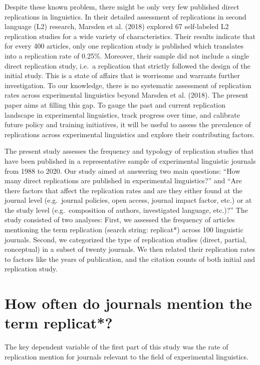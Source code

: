 \documentclass[]{elsarticle} %
\begin{document}
Despite these known problem, there might be only very few published direct replications in linguistics. In their detailed assessment of replications in second language (L2) research, Marsden et al. (2018) explored 67 self-labeled L2 replication studies for a wide variety of characteristics. Their results indicate that for every 400 articles, only one replication study is published which translates into a replication rate of 0.25\%. Moreover, their sample did not include a single direct replication study, i.e.~a replication that strictly followed the design of the initial study. This is a state of affairs that is worrisome and warrants further investigation. To our knowledge, there is no systematic assessment of replication rates across experimental linguistics beyond Marsden et al. (2018). The present paper aims at filling this gap. To gauge the past and current replication landscape in experimental linguistics, track progress over time, and calibrate future policy and training initiatives, it will be useful to assess the prevalence of replications across experimental linguistics and explore their contributing factors.

The present study assesses the frequency and typology of replication studies that have been published in a representative sample of experimental linguistic journals from 1988 to 2020.
Our study aimed at answering two main questions: ``How many direct replications are published in experimental linguistics?'' and ``Are there factors that affect the replication rates and are they either found at the journal level (e.g.~journal policies, open access, journal impact factor, etc.) or at the study level (e.g.~composition of authors, investigated language, etc.)?''
The study consisted of two analyses:
First, we assessed the frequency of articles mentioning the term replication (search string: replicat*) across 100 linguistic journals.
Second, we categorized the type of replication studies (direct, partial, conceptual) in a subset of twenty journals. We then related their replication rates to factors like the years of publication, and the citation counts of both initial and replication study.

\hypertarget{how-often-do-journals-mention-the-term-replicat}{%
\section{How often do journals mention the term replicat*?}\label{how-often-do-journals-mention-the-term-replicat}}

The key dependent variable of the first part of this study was the rate of replication mention for journals relevant to the field of experimental linguistics.
\end{document}
